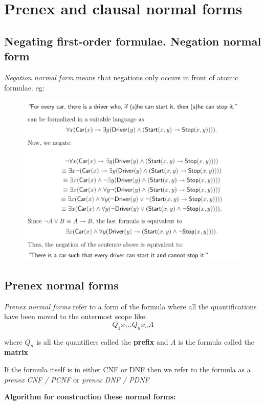 
\section{Prenex and clausal normal forms}
\subsection{Negating first-order formulae. Negation normal form}

\textit{Negation normal form}\cite[p.58]{LecPartII} means that negations only occurs in front of atomic formulae. eg:

\begin{figure}[H]
\includegraphics[scale=0.6]{./figures/negnormform.pdf}
\end{figure}

\subsection{Prenex normal forms}

\textit{Prenex normal forms} \cite[p. 59]{LecPartII} refer to a form of the formula where all the quantifications have been moved to the outermost scope like:
$$ Q_1 x_1 .. Q_n x_n A $$

where $ Q_n $ is all the quantifiers called the \textbf{prefix} and $ A $ is the formula called the \textbf{matrix}

If the formula itself is in either CNF or DNF then we refer to the formula as a \textit{prenex CNF / PCNF} or \textit{prenex DNF / PDNF}

\textbf{Algorithm for construction these normal forms:}

